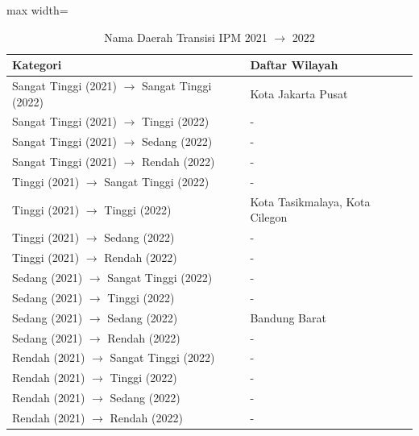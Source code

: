 \begin{table}[H]
\centering
\caption{Nama Daerah Transisi IPM 2021 \(\rightarrow\) 2022} \label{tab:ipmname2021x2022}
\begin{adjustbox}{max width=\textwidth}
\begin{tabular}{|p{4cm}|p{10cm}|}
\hline
\textbf{Kategori} & \textbf{Daftar Wilayah} \\
\hline
Sangat Tinggi (2021) \(\rightarrow\) Sangat Tinggi (2022) & Kota Jakarta Pusat \\
\hline
Sangat Tinggi (2021) \(\rightarrow\) Tinggi (2022) & - \\
\hline
Sangat Tinggi (2021) \(\rightarrow\) Sedang (2022) & - \\
\hline
Sangat Tinggi (2021) \(\rightarrow\) Rendah (2022) & - \\
\hline
Tinggi (2021) \(\rightarrow\) Sangat Tinggi (2022) & - \\
\hline
Tinggi (2021) \(\rightarrow\) Tinggi (2022) & Kota Tasikmalaya, Kota Cilegon \\
\hline
Tinggi (2021) \(\rightarrow\) Sedang (2022) & - \\
\hline
Tinggi (2021) \(\rightarrow\) Rendah (2022) & - \\
\hline
Sedang (2021) \(\rightarrow\) Sangat Tinggi (2022) & - \\
\hline
Sedang (2021) \(\rightarrow\) Tinggi (2022) & - \\
\hline
Sedang (2021) \(\rightarrow\) Sedang (2022) & Bandung Barat \\
\hline
Sedang (2021) \(\rightarrow\) Rendah (2022) & - \\
\hline
Rendah (2021) \(\rightarrow\) Sangat Tinggi (2022) & - \\
\hline
Rendah (2021) \(\rightarrow\) Tinggi (2022) & - \\
\hline
Rendah (2021) \(\rightarrow\) Sedang (2022) & - \\
\hline
Rendah (2021) \(\rightarrow\) Rendah (2022) & - \\
\hline
\end{tabular}
\end{adjustbox}
\end{table}